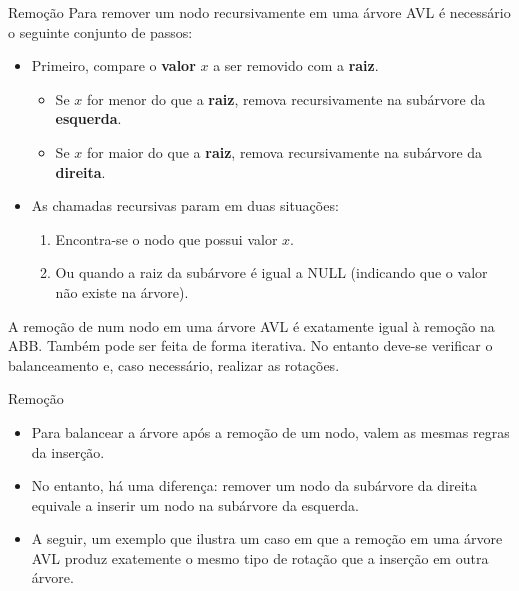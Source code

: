 \documentclass[aspectratio=169]{beamer}
\begin{document}
\begin{frame}{Remoção}
Para remover um nodo recursivamente em uma árvore AVL é necessário o seguinte conjunto de passos:
 \begin{itemize}
  \item Primeiro, compare o {\bf valor} $x$ a ser removido com a {\bf raiz}.
  \begin{itemize}
  \item Se $x$ for menor do que a {\bf raiz}, remova recursivamente na subárvore da {\bf esquerda}.
  \item Se $x$ for maior do que a {\bf raiz}, remova recursivamente na subárvore da {\bf direita}.
  \end{itemize}
  \item As chamadas recursivas param em duas situações:
  \begin{enumerate}
  \item Encontra-se o nodo que possui valor $x$.
  \item Ou quando a raiz da subárvore é igual a NULL (indicando que o valor não existe na árvore).
  \end{enumerate}
 \end{itemize}
A remoção de num nodo em uma árvore AVL é exatamente igual à remoção na ABB. Também pode ser feita de forma iterativa. No entanto deve-se verificar o balanceamento e, caso necessário, realizar as rotações. 
\end{frame}


\begin{frame}{Remoção}
\begin{itemize}
 \item Para balancear a árvore após a remoção de um nodo, valem as mesmas regras da inserção.
 \item No entanto, há uma diferença: remover um nodo da subárvore da direita equivale a inserir um nodo na subárvore da esquerda.
 \item A seguir, um exemplo que ilustra um caso em que a remoção em uma árvore AVL produz exatemente o mesmo tipo de rotação que a inserção em outra árvore.
\end{itemize}
\end{frame}

\end{document}
